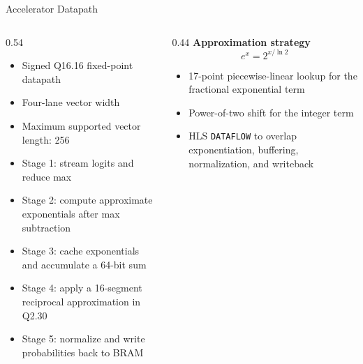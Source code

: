 \documentclass[aspectratio=169]{beamer}
\begin{document}
\begin{frame}{Accelerator Datapath}
\begin{columns}[T,totalwidth=\textwidth]
\begin{column}{0.54\textwidth}
\small
\begin{itemize}
\item Signed Q16.16 fixed-point datapath
\item Four-lane vector width
\item Maximum supported vector length: 256
\item Stage 1: stream logits and reduce max
\item Stage 2: compute approximate exponentials after max subtraction
\item Stage 3: cache exponentials and accumulate a 64-bit sum
\item Stage 4: apply a 16-segment reciprocal approximation in Q2.30
\item Stage 5: normalize and write probabilities back to BRAM
\end{itemize}
\end{column}
\begin{column}{0.44\textwidth}
\small
\textbf{Approximation strategy}
\begin{equation*}
e^x = 2^{x/\ln 2}
\end{equation*}
\begin{itemize}
\item 17-point piecewise-linear lookup for the fractional exponential term
\item Power-of-two shift for the integer term
\item HLS \texttt{DATAFLOW} to overlap exponentiation, buffering, normalization, and writeback
\end{itemize}
\end{column}
\end{columns}
\end{frame}
\end{document}

